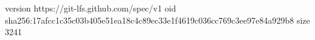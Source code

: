 version https://git-lfs.github.com/spec/v1
oid sha256:17afcc1c35c03b405e51ea18c4c89ec33e1f4619c036cc769c3ee97e84a929b8
size 3241
